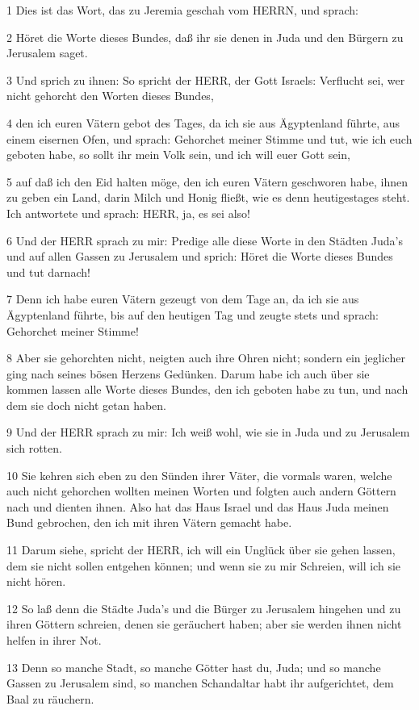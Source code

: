 \par 1 Dies ist das Wort, das zu Jeremia geschah vom HERRN, und sprach:
\par 2 Höret die Worte dieses Bundes, daß ihr sie denen in Juda und den Bürgern zu Jerusalem saget.
\par 3 Und sprich zu ihnen: So spricht der HERR, der Gott Israels: Verflucht sei, wer nicht gehorcht den Worten dieses Bundes,
\par 4 den ich euren Vätern gebot des Tages, da ich sie aus Ägyptenland führte, aus einem eisernen Ofen, und sprach: Gehorchet meiner Stimme und tut, wie ich euch geboten habe, so sollt ihr mein Volk sein, und ich will euer Gott sein,
\par 5 auf daß ich den Eid halten möge, den ich euren Vätern geschworen habe, ihnen zu geben ein Land, darin Milch und Honig fließt, wie es denn heutigestages steht. Ich antwortete und sprach: HERR, ja, es sei also!
\par 6 Und der HERR sprach zu mir: Predige alle diese Worte in den Städten Juda's und auf allen Gassen zu Jerusalem und sprich: Höret die Worte dieses Bundes und tut darnach!
\par 7 Denn ich habe euren Vätern gezeugt von dem Tage an, da ich sie aus Ägyptenland führte, bis auf den heutigen Tag und zeugte stets und sprach: Gehorchet meiner Stimme!
\par 8 Aber sie gehorchten nicht, neigten auch ihre Ohren nicht; sondern ein jeglicher ging nach seines bösen Herzens Gedünken. Darum habe ich auch über sie kommen lassen alle Worte dieses Bundes, den ich geboten habe zu tun, und nach dem sie doch nicht getan haben.
\par 9 Und der HERR sprach zu mir: Ich weiß wohl, wie sie in Juda und zu Jerusalem sich rotten.
\par 10 Sie kehren sich eben zu den Sünden ihrer Väter, die vormals waren, welche auch nicht gehorchen wollten meinen Worten und folgten auch andern Göttern nach und dienten ihnen. Also hat das Haus Israel und das Haus Juda meinen Bund gebrochen, den ich mit ihren Vätern gemacht habe.
\par 11 Darum siehe, spricht der HERR, ich will ein Unglück über sie gehen lassen, dem sie nicht sollen entgehen können; und wenn sie zu mir Schreien, will ich sie nicht hören.
\par 12 So laß denn die Städte Juda's und die Bürger zu Jerusalem hingehen und zu ihren Göttern schreien, denen sie geräuchert haben; aber sie werden ihnen nicht helfen in ihrer Not.
\par 13 Denn so manche Stadt, so manche Götter hast du, Juda; und so manche Gassen zu Jerusalem sind, so manchen Schandaltar habt ihr aufgerichtet, dem Baal zu räuchern.
